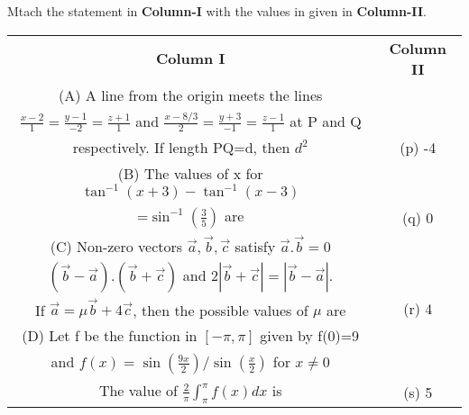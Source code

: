 \item Mtach the statement in \textbf{Column-I} with the values in given in \textbf{Column-II}.
\begin{table}[ht!]
\centering
\begin{tabular}{c c} 
 \textbf{Column I} & \textbf{Column II}\\ [0.5ex] 
 (A) A line from the origin meets the lines\\
     $\frac{x-2}{1}=\frac{y-1}{-2}=\frac{z+1}{1}$ and
     $\frac{x-8/3}{2}=\frac{y+3}{-1}=\frac{z-1}{1}$ at
     P and Q\\ respectively. If length PQ=d, then $d^2$                                  &(p) -4\\ 
 (B) The values of x for
      $\tan^{-1}(x+3)-\tan^{-1}(x-3)$\\=$\sin^{-1}(\frac{3}{5})$ are                     &(q) 0\\
 (C) Non-zero vectors $\overrightarrow{a}, \overrightarrow{b}, 
     \overrightarrow{c}$ satisfy $\overrightarrow{a}.\overrightarrow{b}=0$\\
     $(\overrightarrow{b}-\overrightarrow{a}).(\overrightarrow{b}+\overrightarrow{c})$ and 
     $2|\overrightarrow{b}+\overrightarrow{c}|=|\overrightarrow{b}-\overrightarrow{a}|$.\\ 
     If $\overrightarrow{a}=\mu\overrightarrow{b}+4\overrightarrow{c}$,
     then the possible values of $\mu$ are                                               &(r) 4\\
 (D) Let f be the function in $[-\pi, \pi]$ given by f(0)=9\\
     and $f(x)=\sin(\frac{9x}{2})/\sin(\frac{x}{2})$ for $x \neq 0$\\
     The value of $\frac{2}{\pi}\int_{\pi}^{\pi}f(x)dx$ is                               &(s) 5\\[1ex]
                                                            
\end{tabular}
\end{table}

